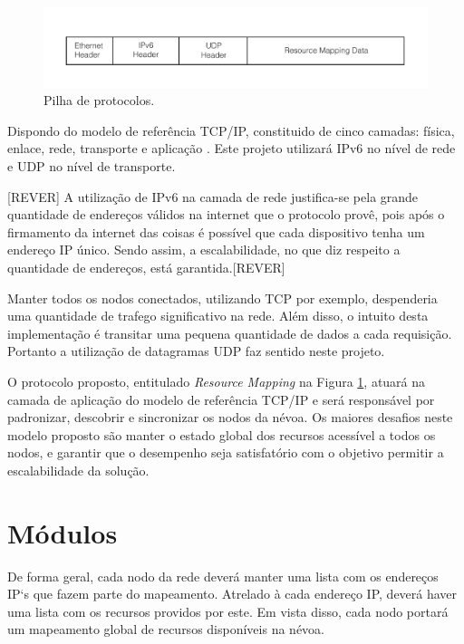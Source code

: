 \begin{figure}[htb!]
    \centering\includegraphics[width=.75\textwidth]{fig2.pdf}
    \caption%
    {\label{fig:fig2} Pilha de protocolos.}
\end{figure}

Dispondo do modelo de referência TCP/IP, constituido de cinco camadas: física, enlace, rede, transporte e aplicação \cite{tanenbaum2011redes}.
Este projeto utilizará IPv6 no nível de rede e UDP no nível de transporte.

[REVER] A utilização de IPv6 na camada de rede justifica-se pela grande quantidade de endereços válidos na internet que o protocolo provê, pois após o firmamento da internet das coisas é possível que cada dispositivo tenha um endereço IP único.
Sendo assim, a escalabilidade, no que diz respeito a quantidade de endereços, está garantida.[REVER]

Manter todos os nodos conectados, utilizando TCP por exemplo, despenderia uma quantidade de trafego significativo na rede. Além disso, o intuito desta implementação é transitar uma pequena quantidade de dados a cada requisição.
Portanto a utilização de datagramas UDP faz sentido neste projeto.

O protocolo proposto, entitulado \textit{Resource Mapping} na Figura \ref{fig:fig2}, atuará na camada de aplicação do modelo de referência TCP/IP \cite{tanenbaum2011redes} e será responsável por padronizar, descobrir e sincronizar os nodos da névoa.
Os maiores desafios neste modelo proposto são manter o estado global dos recursos acessível a todos os nodos, e garantir que o desempenho seja satisfatório com o objetivo permitir a escalabilidade da solução.



\section{Módulos}

De forma geral, cada nodo da rede deverá manter uma lista com os endereços IP`s que fazem parte do mapeamento.
Atrelado à cada endereço IP, deverá haver uma lista com os recursos providos por este.
Em vista disso, cada nodo portará um mapeamento global de recursos disponíveis na névoa.

